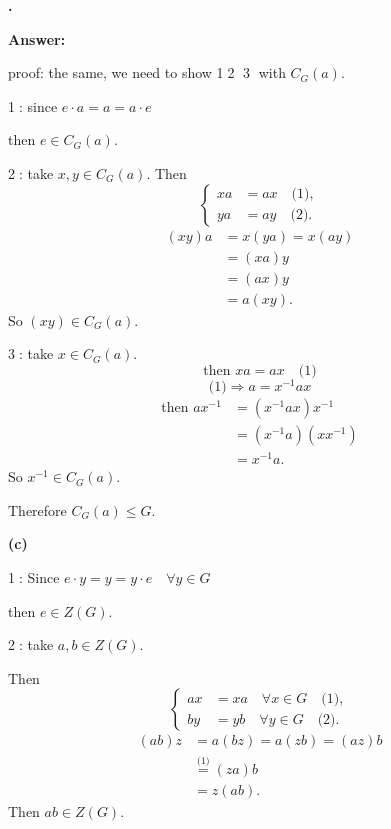\documentclass[11pt]{article}
\newcounter{ej}
\renewcommand{\theej}{\textbf{\arabic{ej}.}}
\newenvironment{ej}{
    \stepcounter{ej}
    \begin{list}{\theej}{
        \setlength{\itemindent}{0ex}
        \setlength{\labelwidth}{4ex}
        \setlength{\labelsep}{0.5ex}
        \setlength{\leftmargin}{4ex}
        \setlength{\listparindent}{0ex}
        \setlength{\topsep}{3mm plus 0.5mm minus 0.5mm}
        \setlength{\parsep}{0mm}
        \setlength{\itemsep}{1mm plus 0.3mm minus 0.3mm}
        \setlength{\rightmargin}{0ex}
    }
    \item
}{\end{list}}
\newenvironment{sol}{
    \def\FrameCommand##1{\fcolorbox{black}{gray!20}{##1}}%
    \MakeFramed{\advance\hsize-\width \FrameRestore}%
    \noindent\textbf{Answer:} \ignorespaces
}{\endMakeFramed}
\begin{document}
\begin{ej}
\begin{sol}
            proof: the same, we need to show \textcircled{1}\textcircled{2}
            \textcircled{3} with $C_G(a)$.

            \textcircled{1}: since $e\cdot a=a=a\cdot e$

            then $e\in C_G(a)$.

            \textcircled{2}: take $x,y\in C_G(a)$.
            Then
            \[
                \left\{
                \begin{aligned}
                    xa&=ax\quad\text{(1)},\\
                    ya&=ay\quad\text{(2)}.
                \end{aligned}
                \right.
            \]
            \begin{align*}
                (xy)a&=x(ya)=x(ay)\\
                    &=(xa)y\\
                    &=(ax)y\\
                    &=a(xy).
            \end{align*}
            So $(xy)\in C_G(a)$.

            \textcircled{3}: take $x\in C_G(a)$.
            \[
                \text{then }xa=ax\quad\text{(1)}
            \]
            \[
                \text{(1)}\Rightarrow a=x^{-1}ax
            \]
            \begin{align*}
                \text{then }ax^{-1}
                    &=(x^{-1}ax)x^{-1}\\
                    &=(x^{-1}a)(xx^{-1})\\
                    &=x^{-1}a.
            \end{align*}
            So $x^{-1}\in C_G(a)$.

            Therefore $C_G(a)\le G$.

            \medskip
            \textbf{(c)}

            \textcircled{1}: Since $e\cdot y=y=y\cdot e\quad\forall y\in G$

            then $e\in Z(G)$.

            \textcircled{2}: take $a,b\in Z(G)$.

            Then
            \[
                \left\{
                \begin{aligned}
                    ax&=xa\quad\forall x\in G\quad\text{(1)},\\
                    by&=yb\quad\forall y\in G\quad\text{(2)}.
                \end{aligned}
                \right.
            \]
            \begin{align*}
                (ab)z&=a(bz)=a(zb)=(az)b\\
                    &\overset{\text{(1)}}{=}(za)b\\
                    &=z(ab).
            \end{align*}
            Then $ab\in Z(G)$.


\end{sol}
\end{ej}
\end{document}
